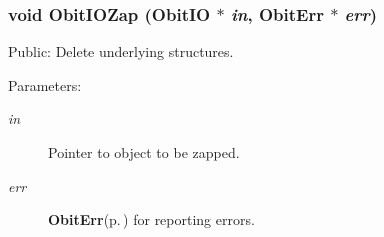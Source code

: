 \subsubsection{\setlength{\rightskip}{0pt plus 5cm}void Obit\-IOZap ({\bf Obit\-IO} $\ast$ {\em in}, {\bf Obit\-Err} $\ast$ {\em err})}\label{ObitIO_8c_a9}


Public: Delete underlying structures. 

\begin{Desc}
\item[Parameters:]
\begin{description}
\item[{\em in}]Pointer to object to be zapped. \item[{\em err}]{\bf Obit\-Err}{\rm (p.\,\pageref{structObitErr})} for reporting errors. \end{description}
\end{Desc}
